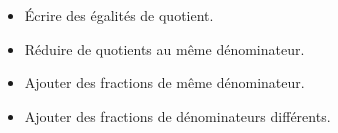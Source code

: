 \begin{prerequis}[Prérequis]    
    \begin{itemize}
        \item Écrire des égalités de quotient.
        \item Réduire de quotients au même dénominateur.
        \columnbreak
        \item Ajouter des fractions de même dénominateur.
        \item Ajouter des fractions de dénominateurs différents. 
    \end{itemize}
\end{prerequis}
